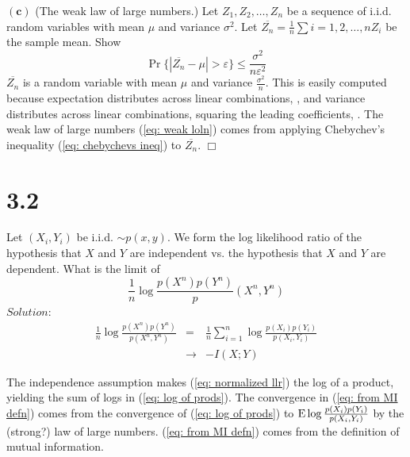 \documentclass[10pt]{article}
\DeclareMathOperator*{\E}{\mbox{\text{E}}}
\newcommand{\pref}[1]{{(\ref{#1})}}
\begin{document}
\begin{scriptsize}
\begin{multicols}{3}
$\mathbf{(c)}$
(The weak law of large numbers.) Let $Z_1,Z_2,\dots,Z_n$ be a sequence of
i.i.d. random variables with mean $\mu$ and variance $\sigma^2$. Let
$\overline{Z_n} = \frac{1}{n}\sum{i=1,2,\dots,n}Z_i$ be the sample mean.
Show 
\begin{equation}
    \Pr \{|\overline{Z_n} - \mu| > \varepsilon\} \leq
    \frac{\sigma^2}{n\varepsilon^2}
    \label{eq: weak loln}
\end{equation}
\proof
$\overline{Z_n}$ is a random variable with mean $\mu$ and variance
$\frac{\sigma^2}{n}$. This is easily computed because expectation
distributes across linear combinations, 
, and variance distributes across linear combinations, squaring the
leading coefficients,
. The weak law of large numbers \pref{eq: weak loln} comes from applying
Chebychev's inequality \pref{eq: chebychevs ineq} to $\overline{Z_n}$.
$\Box$

\section*{3.2}
Let $(X_i,Y_i)$ be i.i.d. $\sim p(x,y)$. We form the log likelihood ratio
of the hypothesis that $X$ and $Y$ are independent vs. the hypothesis that
$X$ and $Y$ are dependent. What is the limit of
\begin{equation}
    \frac{1}{n}\log \frac{p(X^n)p(Y^n)}p(X^n,Y^n)
    \label{eq: normalized llr}
\end{equation}
$Solution$:
\begin{eqnarray}
    \frac{1}{n}\log \frac{p(X^n)p(Y^n)}{p(X^n,Y^n)}
    &=& \frac{1}{n} \sum_{i=1}^{n} \log \frac{p(X_i)p(Y_i)}{p(X_i,Y_i)}
    \label{eq: log of prods} \\
    &\rightarrow& -I(X;Y) 
    \label{eq: from MI defn}
\end{eqnarray}

The independence assumption makes \pref{eq: normalized llr} the log of a
product, yielding the sum of logs in \pref{eq: log of prods}.
The convergence in \pref{eq: from MI defn} comes from the convergence of
\pref{eq: log of prods} to $\E \log \frac{p(X_i)p(Y_i)}{p(X_i,Y_i)}$ by
the (strong?) law of large numbers. \pref{eq: from MI defn} comes from the
definition of mutual information.


\end{multicols}
\end{scriptsize}
\end{document}
